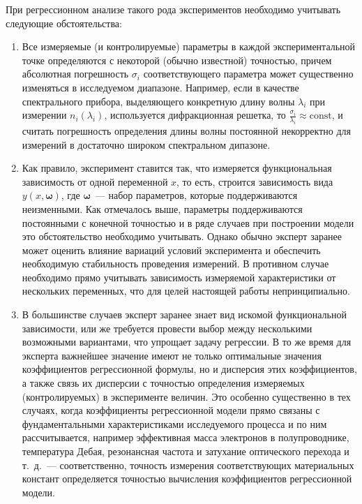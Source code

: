 \documentclass[11pt,a4paper]{article}
\theoremstyle{definition}
\begin{document}
При регрессионном анализе такого рода экспериментов необходимо
учитывать следующие обстоятельства:
\begin{enumerate}
  \item Все измеряемые (и контролируемые) параметры в каждой
	экспериментальной точке определяются с некоторой (обычно известной) 
	точностью, причем абсолютная погрешность $\sigma_i$ соответствующего параметра может
	существенно изменяться в исследуемом диапазоне. Например, если в качестве
	спектрального прибора, выделяющего конкретную длину волны $\lambda_i$ при
	измерении $n_i(\lambda_i)$, используется дифракционная решетка, то
	$\frac{\sigma_i}{\lambda_i} \approx \text{const}$, и
	считать погрешность определения длины волны постоянной некорректно для
	измерений в достаточно широком спектральном дипазоне.
  \item Как правило, эксперимент ставится так, что измеряется функциональная
	зависимость от одной переменной $x$, то есть, строится зависимость вида $y(x,
	\boldsymbol{\omega})$, где $\boldsymbol{\omega}$~--- набор параметров,
	которые поддерживаются неизменными. Как
	отмечалось выше, параметры поддерживаются постоянными с конечной
	точностью и в ряде случаев при построении модели это обстоятельство 
	необходимо учитывать. Однако обычно эксперт заранее может оценить
	влияние вариаций условий эксперимента и обеспечить необходимую
	стабильность проведения измерений. В противном случае необходимо прямо
	учитывать зависимость измеряемой характеристики от нескольких
	переменных, что для целей настоящей работы непринципиально.
  \item В большинстве случаев эксперт заранее знает вид
	искомой функциональной зависимости, или же требуется провести выбор
	между несколькими возможными вариантами, что упрощает задачу регрессии.
	В то же время для эксперта важнейшее значение имеют не только
	оптимальные значения коэффициентов регрессионной формулы, но и дисперсия
	этих коэффициентов, а также связь их дисперсии с точностью определения измеряемых
	(контролируемых) в эксперименте величин. Это особенно существенно в тех
	случаях, когда коэффициенты регрессионной модели прямо связаны с
	фундаментальными характеристиками исследуемого процесса и по ним
	рассчитывается, например эффективная масса электронов в полупроводнике,
	температура Дебая, резонансная частота и затухание оптического перехода и
	т.~д.~--- соответственно, точность измерения соответствующих материальных
	констант определяется точностью вычисления коэффициентов регрессионной
	модели.
\end{enumerate}
\end{document}
